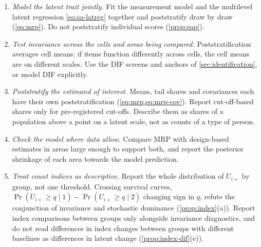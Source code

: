 \begin{enumerate}[(1)]
  \item \emph{Model the latent trait jointly.} Fit the measurement model and the multilevel latent regression \eqref{eq:sa-latreg} together and poststratify draw by draw (\cref{eq:mrp}). Do not poststratify individual scores (\cref{prop:eap}).
  \item \emph{Test invariance across the cells and areas being compared.} Poststratification averages cell means; if items function differently across cells, the cell means are on different scales. Use the DIF screens and anchors of \cref{sec:identification}, or model DIF explicitly.
  \item \emph{Poststratify the estimand of interest.} Means, tail shares and covariances each have their own poststratification (\cref{eq:mrp,eq:mrp-cov}). Report cut-off-based shares only for pre-registered cut-offs. Describe them as shares of a population above a point on a latent scale, not as counts of a type of person.
  \item \emph{Check the model where data allow.} Compare MRP with design-based estimates in areas large enough to support both, and report the posterior shrinkage of each area towards the model prediction.
  \item \emph{Treat count indices as descriptive.} Report the whole distribution of $U_{i+}$ by group, not one threshold. Crossing survival curves, $\Pr(U_{i+}\ge q\mid1)-\Pr(U_{i+}\ge q\mid2)$ changing sign in $q$, refute the conjunction of invariance and stochastic dominance (\cref{prop:index}(a)). Report index comparisons between groups only alongside invariance diagnostics, and do not read differences in index changes between groups with different baselines as differences in latent change (\cref{prop:index-dif}(e)).
\end{enumerate}
